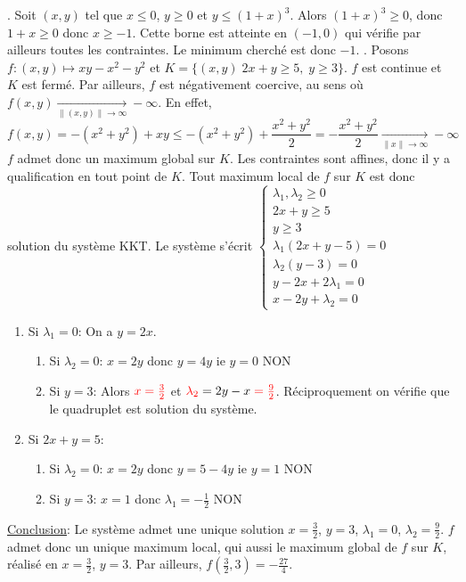 \documentclass{report}
\begin{document}
. Soit $(x,y)$ tel que $x\leq 0$, $y\geq 0$ et $y\leq (1+x)^3$. Alors $(1+x)^3\geq 0$, donc $1+x\geq 0$ donc $x\geq -1$. Cette borne est atteinte en $(-1,0)$ qui vérifie par ailleurs toutes les contraintes. Le minimum cherché est donc $-1$. \newline
{}. Posons $f:(x,y)\mapsto xy-x^2-y^2$ et $K=\{(x,y)\; 2x+y\geq 5, \; y\geq 3\}$. \newline
$f$ est continue et $K$ est fermé. Par ailleurs, $f$ est négativement coercive, au sens où $f(x,y)\xrightarrow[\|(x,y)\|\to \infty ]{} -\infty$. En effet, $$f(x,y)=-(x^2+y^2) + xy \leq -(x^2+y^2) + \frac{x^2+y^2}{2} = -\frac{x^2+y^2}{2}\xrightarrow[\|x\|\to \infty ]{} -\infty$$
$f$ admet donc un maximum global sur $K$.\newline
\newline
Les contraintes sont affines, donc il y a qualification en tout point de $K$. Tout maximum local de $f$ sur $K$ est donc solution du système KKT.\newline
Le système s'écrit $\begin{cases}
\lambda_1, \lambda_2 \geq 0 \\
2x+y\geq 5 \\
y\geq 3 \\
\lambda_1(2x+y-5)=0 \\
\lambda_2(y-3)=0 \\
y-2x+2\lambda_1 =0 \\
x-2y+\lambda_2=0
\end{cases}$\newline
\begin{enumerate}
\item Si $\lambda_1=0$:\newline
On a $y=2x$.
\begin{enumerate}
\item Si $\lambda_2=0$:\newline
$x=2y$ donc $y=4y$ ie $y=0$ NON
\item Si $y=3$:\newline
Alors $\color{red}{x=\frac 32}$ et $\textcolor{red}{\lambda_2}=2y-x\;\textcolor{red}{=\frac 92}$. Réciproquement on vérifie que le quadruplet est solution du système.
\end{enumerate}
\item Si $2x+y=5$:
\begin{enumerate}
\item Si $\lambda_2=0$:\newline
$x=2y$ donc $y=5-4y$ ie $y=1$ NON
\item Si $y=3$:\newline
$x=1$ donc $\lambda_1=-\frac 12$ NON
\end{enumerate}
\end{enumerate}
\underline{Conclusion}: Le système admet une unique solution $x=\frac 32$, $y=3$, $\lambda_1=0$, $\lambda_2=\frac 92$. $f$ admet donc un unique maximum local, qui aussi le maximum global de $f$ sur $K$, réalisé en $x=\frac 32$, $y=3$. Par ailleurs, $f(\frac 32, 3)=-\frac{27}4$.
\end{document}
